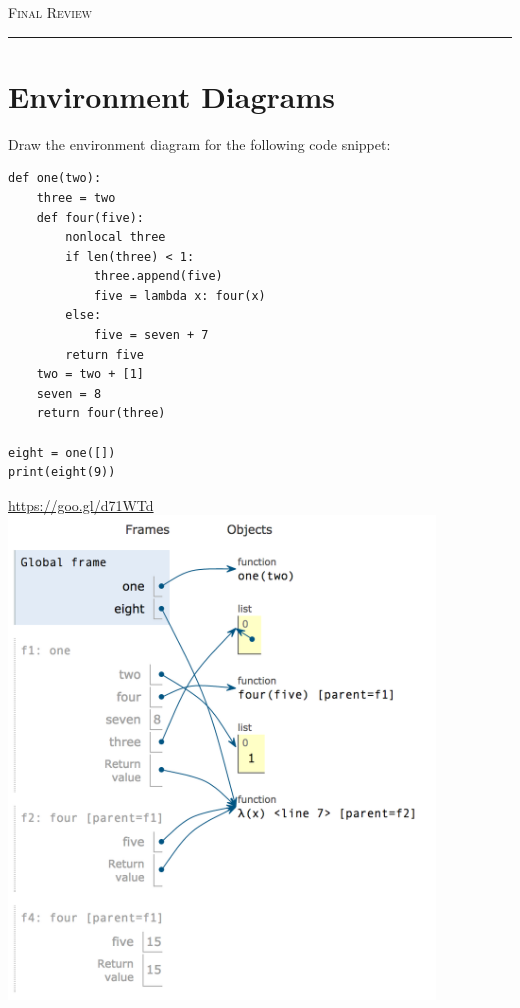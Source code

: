 \documentclass{exam}
\begin{document}
\pagebreak


{\huge \vspace*{0.5cm} \textsc{Final Review}}


\rule{\textwidth}{0.15em}

\section{Environment Diagrams}
\begin{questions}

\begin{blocksection}
\question Draw the environment diagram for the following code snippet:
\begin{lstlisting}
def one(two):
    three = two
    def four(five):
        nonlocal three
        if len(three) < 1:
            three.append(five)
            five = lambda x: four(x)
        else:
            five = seven + 7
        return five
    two = two + [1]
    seven = 8
    return four(three)

eight = one([])
print(eight(9))
\end{lstlisting}
\end{blocksection}

\begin{solution}
\url{https://goo.gl/d71WTd}
\linebreak
\includegraphics[width=0.85\textwidth]{envdiag}


\end{solution}
\end{questions}
\end{document}
